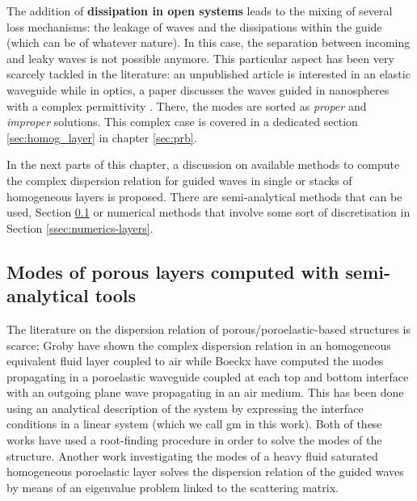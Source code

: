 The addition of \textbf{dissipation in open systems} leads to the mixing of several loss mechanisms: the leakage of waves and the dissipations within the guide (which can be of whatever nature). In this case, the separation between incoming and leaky waves is not possible anymore. This particular aspect has been very scarcely tackled in the literature: an unpublished article is interested in an elastic waveguide \cite{kiefer2020} while in optics, a paper discusses the waves guided in nanospheres with a complex permittivity \cite{campione2011}. There, the modes are sorted as \textit{proper} and \textit{improper} solutions. This complex case is covered in a dedicated section \ref{sec:homog_layer} in chapter \ref{sec:prb}.

In the next parts of this chapter, a discussion on available methods to compute the complex dispersion relation for guided waves in single or stacks of homogeneous layers is proposed. There are semi-analytical methods that can be used, Section \ref{ssec:semi-analyt-layers} or numerical methods that involve some sort of discretisation in Section \ref{ssec:numerics-layers}.

\subsection{Modes of porous layers computed with semi-analytical tools}
\label{ssec:semi-analyt-layers}
The literature on the dispersion relation of porous/poroelastic-based structures is scarce; Groby \etal \cite{groby2008} have shown the complex dispersion relation in an homogeneous equivalent fluid layer coupled to air while Boeckx \etal\cite{boeckx2005} have computed the modes propagating in a poroelastic waveguide coupled at each top and bottom interface with an outgoing plane wave propagating in an air medium. This has been done using an analytical description of the system by expressing the interface conditions in a linear system (which we call \acrshort{gm} in this work). Both of these works have used a root-finding procedure in order to solve the modes of the structure. Another work investigating the modes of a heavy fluid saturated homogeneous poroelastic layer solves the dispersion relation of the guided waves by means of an eigenvalue problem linked to the scattering matrix\cite{belloncle2003}.

